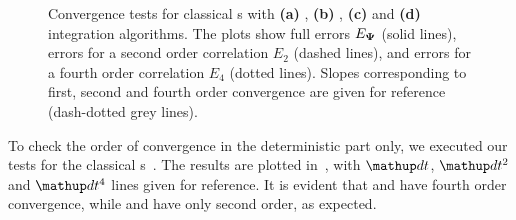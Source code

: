 \begin{figure}
    \caption[Convergence tests, s]{
    Convergence tests for classical s with \textbf{(a)} , \textbf{(b)} , \textbf{(c)}  and \textbf{(d)}  integration algorithms.
    The plots show full errors $E_{\mathbf{\Psi}}$ (solid lines), errors for a second order correlation $E_2$ (dashed lines), and errors for a fourth order correlation $E_4$ (dotted lines).
    Slopes corresponding to first, second and fourth order convergence are given for reference (dash-dotted grey lines).
    }%

    \label{fig:numerical:convergence-gpe}
\end{figure}

To check the order of convergence in the deterministic part only, we executed our tests for the classical s~.
The results are plotted in~, with $\upd t$, $\upd t^2$ and $\upd t^4$ lines given for reference.
It is evident that  and  have fourth order convergence, while  and  have only second order, as expected.

